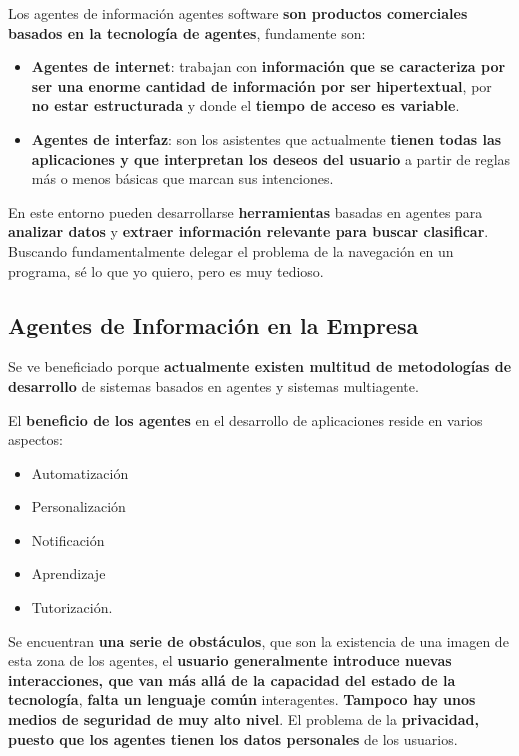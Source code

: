 \documentclass[12pt, twoside, openright]{report} %
\begin{document}
Los agentes de información agentes software \textbf{son productos comerciales basados en la tecnología de agentes}, fundamente son:
\begin{itemize}
	\item \textbf{Agentes de internet}: trabajan con \textbf{información que se caracteriza por ser una enorme cantidad de información por ser hipertextual}, por \textbf{no estar estructurada} y donde el \textbf{tiempo de acceso es variable}.
	\item \textbf{Agentes de interfaz}: son los asistentes que actualmente \textbf{tienen todas las aplicaciones y que interpretan los deseos del usuario} a partir de reglas más o menos básicas que marcan sus intenciones.
\end{itemize}

En este entorno pueden desarrollarse \textbf{herramientas} basadas en agentes para \textbf{analizar datos} y \textbf{extraer información relevante para buscar clasificar}. Buscando fundamentalmente delegar el problema de la navegación en un programa, sé lo que yo quiero, pero es muy tedioso.

\subsection{Agentes de Información en la Empresa}
Se ve beneficiado porque \textbf{actualmente existen multitud de metodologías de desarrollo} de sistemas basados en agentes y sistemas multiagente.

El  \textbf{beneficio de los agentes} en el desarrollo de aplicaciones reside en varios aspectos:
\begin{itemize}
	\item Automatización
	\item Personalización
	\item Notificación
	\item Aprendizaje 
	\item Tutorización. 
\end{itemize} 

Se encuentran \textbf{una serie de obstáculos}, que son la existencia de una imagen de esta zona de los agentes, el \textbf{usuario generalmente introduce nuevas interacciones, que van más allá de la capacidad del estado de la tecnología}, \textbf{falta un lenguaje común} interagentes. \textbf{Tampoco hay unos medios de seguridad de muy alto nivel}. El problema de la \textbf{privacidad, puesto que los agentes tienen los datos personales} de los usuarios.
\end{document}
